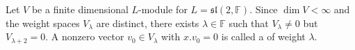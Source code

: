 Let $V$ be a finite dimensional $L$-module for $L = \mathfrak{sl}(2, \mathbb{F})$. Since $\dim V < \infty$ and the weight spaces $V_\lambda$ are distinct, there exists $\lambda \in \mathbb{F}$ such that $V_\lambda \neq 0$ but $V_{\lambda+2} = 0$. A nonzero vector $v_0 \in V_\lambda$ with $x.v_0 = 0$ is called a  of weight $\lambda$.
